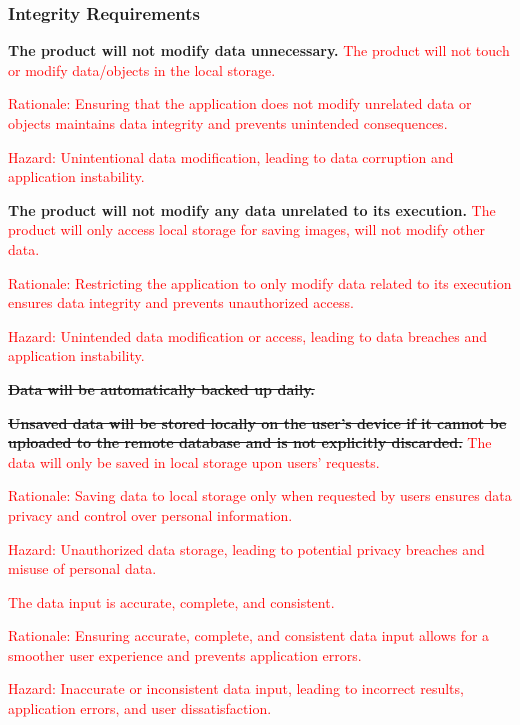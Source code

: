 \documentclass{article}
\newcounter{irreqnum} %
\begin{document}
\subsubsection{Integrity Requirements}
\begin{itemize}
    \item[IR\refstepcounter{irreqnum}\theirreqnum \label{R_Inputs}:] \textbf{The product will not modify data unnecessary.}
    \textcolor{red}{The product will not touch or modify data/objects in the local storage.}
    \item[] \textcolor{red}{Rationale: Ensuring that the application does not modify unrelated data or objects maintains data integrity and prevents unintended consequences.}
    \item[] \textcolor{red}{Hazard: Unintentional data modification, leading to data corruption and application instability.}

    \item[IR\refstepcounter{irreqnum}\theirreqnum \label{R_Inputs}:] \textbf{The product will not modify any data unrelated to its execution.}
    \textcolor{red}{The product will only access local storage for saving images, will not modify other data.}
    \item[] \textcolor{red}{Rationale: Restricting the application to only modify data related to its execution ensures data integrity and prevents unauthorized access.}
    \item[] \textcolor{red}{Hazard: Unintended data modification or access, leading to data breaches and application instability.}

    \item[IR\refstepcounter{irreqnum}\theirreqnum \label{R_Inputs}:] \sout{\textbf{Data will be automatically backed up daily.}}
    \item[IR\refstepcounter{irreqnum}\theirreqnum \label{R_Inputs}:] \sout{\textbf{Unsaved data will be stored locally on the user's device if it cannot be uploaded to the remote database and is not explicitly discarded.}}
    \textcolor{red}{The data will only be saved in local storage upon users' requests.}
    \item[] \textcolor{red}{Rationale: Saving data to local storage only when requested by users ensures data privacy and control over personal information.}
    \item[] \textcolor{red}{Hazard: Unauthorized data storage, leading to potential privacy breaches and misuse of personal data.}
    
    \textcolor{red}{
    \item[IR\refstepcounter{irreqnum}\theirreqnum
    \label{R_Inputs}:] The data input is accurate, complete, and consistent.
    \item[] \textcolor{red}{Rationale: Ensuring accurate, complete, and consistent data input allows for a smoother user experience and prevents application errors.}
    \item[] \textcolor{red}{Hazard: Inaccurate or inconsistent data input, leading to incorrect results, application errors, and user dissatisfaction.}


}
\end{itemize}
\end{document}
